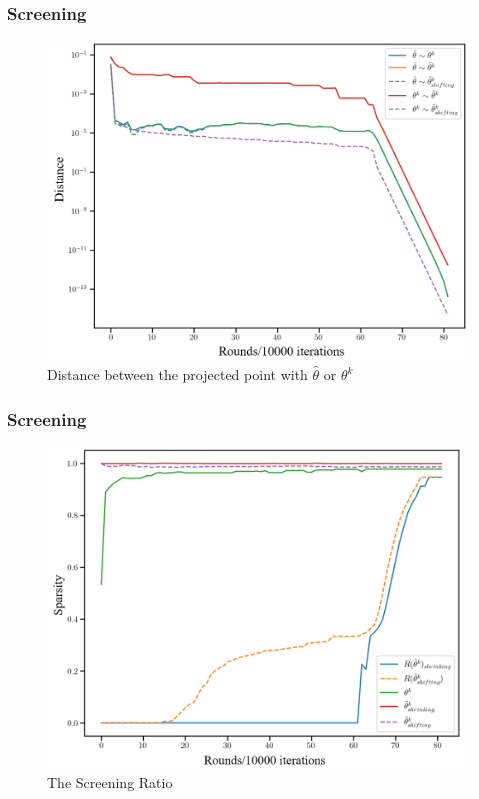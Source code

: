 \documentclass[dvipdfmx,cjk,t,10pt]{beamer}
\begin{document}
\begin{frame}
\frametitle{Screening}
	\begin{figure}[htbp]
	\begin{center}	
	\includegraphics[width=0.8\hsize]{pic/dis}
	\caption{Distance between the projected point with $\hat{\theta}$ or $\theta^k$ }
	\end{center}	
	\end{figure}

\end{frame}

\begin{frame}
\frametitle{Screening}
	\begin{figure}[htbp]
	\begin{center}	
	\includegraphics[width=0.8\hsize]{pic/spa}
	\caption{The Screening Ratio}
	\end{center}	
	\end{figure}

\end{frame}
\end{document}
